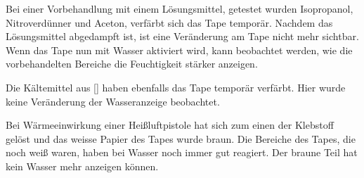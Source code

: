 

Bei einer Vorbehandlung mit einem Lösungsmittel, getestet wurden Isopropanol, Nitroverdünner und Aceton, verfärbt sich das Tape temporär. Nachdem das Lösungsmittel abgedampft ist, ist eine Veränderung am Tape nicht mehr sichtbar. Wenn das Tape nun mit Wasser aktiviert wird, kann beobachtet werden, wie die vorbehandelten Bereiche die Feuchtigkeit stärker anzeigen.

Die Kältemittel aus \ref{} haben ebenfalls das Tape temporär verfärbt. Hier wurde keine Veränderung der Wasseranzeige beobachtet.

Bei Wärmeeinwirkung einer Heißluftpistole hat sich zum einen der Klebstoff gelöst und das weisse Papier des Tapes wurde braun. Die Bereiche des Tapes, die noch weiß waren, haben bei Wasser noch immer gut reagiert. Der braune Teil hat kein Wasser mehr anzeigen können.
